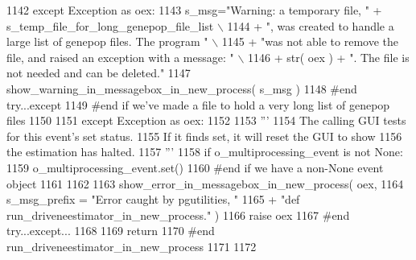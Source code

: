 \begin{DoxyCode}
1142             \textcolor{keywordflow}{except} Exception \textcolor{keyword}{as} oex:
1143                 s\_msg=\textcolor{stringliteral}{"Warning:  a temporary file, "} + s\_temp\_file\_for\_long\_genepop\_file\_list \(\backslash\)
1144                                 + \textcolor{stringliteral}{", was created to handle a large list of genepop files.  The program "} \(\backslash\)
1145                                 + \textcolor{stringliteral}{"was not able to remove the file, and raised an exception with a message:
       "} \(\backslash\)
1146                                 + str( oex ) + \textcolor{stringliteral}{".  The file is not needed and can be deleted."} 
1147                 show\_warning\_in\_messagebox\_in\_new\_process( s\_msg )  
1148             \textcolor{comment}{#end try...except}
1149         \textcolor{comment}{#end if we've made a file to hold a very long list of genepop files}
1150 
1151     \textcolor{keywordflow}{except} Exception \textcolor{keyword}{as} oex:
1152 
1153         \textcolor{stringliteral}{'''}
1154 \textcolor{stringliteral}{        The calling GUI tests for this event's set status.}
1155 \textcolor{stringliteral}{        If it finds set, it will reset the GUI to show}
1156 \textcolor{stringliteral}{        the estimation has halted.}
1157 \textcolor{stringliteral}{        '''}
1158         \textcolor{keywordflow}{if} o\_multiprocessing\_event \textcolor{keywordflow}{is} \textcolor{keywordflow}{not} \textcolor{keywordtype}{None}:
1159             o\_multiprocessing\_event.set()
1160         \textcolor{comment}{#end if we have a non-None event object}
1161         
1162 
1163         show\_error\_in\_messagebox\_in\_new\_process( oex, 
1164                 s\_msg\_prefix = \textcolor{stringliteral}{"Error caught by pgutilities, "}
1165                                 + \textcolor{stringliteral}{"def run\_driveneestimator\_in\_new\_process."} )
1166         \textcolor{keywordflow}{raise} oex
1167     \textcolor{comment}{#end try...except...}
1168 
1169     \textcolor{keywordflow}{return}
1170 \textcolor{comment}{#end run\_driveneestimator\_in\_new\_process}
1171 
1172 
\end{DoxyCode}
